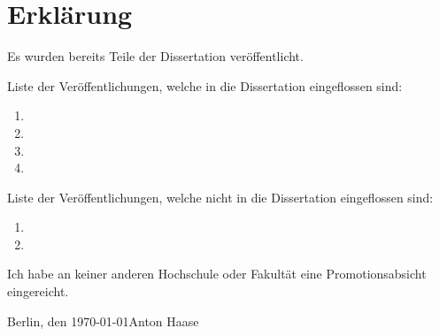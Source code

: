 \noindent
\pagestyle{empty}

\section*{Erklärung}

Es wurden bereits Teile der Dissertation veröffentlicht.
\vspace{2ex}

Liste der Veröffentlichungen, welche in die Dissertation eingeflossen sind:

\begin{enumerate}[label=\arabic*) ]
    \item {} 

    \item {} 

    \item {} 

    \item {} 

\end{enumerate}
Liste der Veröffentlichungen, welche nicht in die Dissertation eingeflossen sind:
\begin{enumerate}[label=\arabic*) ]
    \item {} 

    \item {} 

\end{enumerate}


Ich habe an keiner anderen Hochschule oder Fakultät eine Promotionsabsicht eingereicht.

\vspace{3cm}

\noindent Berlin, den \today \hfill Anton Haase

\cleardoublepage
